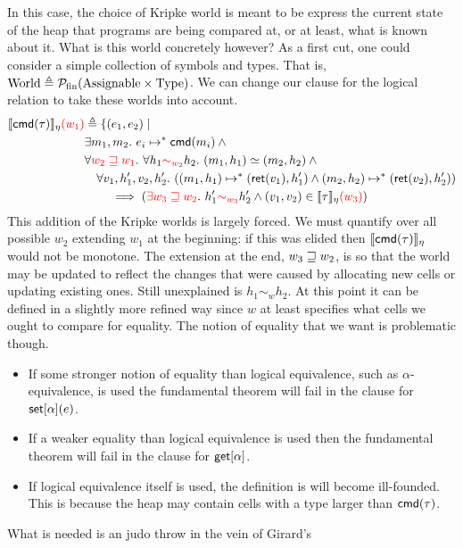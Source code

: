 In this case, the choice of Kripke world is meant to be express the
current state of the heap that programs are being compared at, or at
least, what is known about it. What is this world concretely however?
As a first cut, one could consider a simple collection of symbols and
types. That is,
$\mathrm{World} \triangleq \mathcal{P_{\mathrm{fin}}}(\mathrm{Assignable} \times \mathrm{Type})$. We can change
our clause for the logical relation to take these worlds into
account.
\begin{align*}
  \llbracket \mathsf{cmd}(\tau) \rrbracket_\eta{\color{red} (w_1)}& \triangleq \{(e_1, e_2) \mid\\
  &\exists m_1, m_2.\ e_i \mapsto^* \mathsf{cmd}(m_i) \land{}\\
  &\forall {\color{red} w_2 \ensuremath{\mathrel{\sqsupseteq}}w_1}.\ \forall h_1 {\color{red} \sim_{w_2}} h_2.
  \ (m_1, h_1) \simeq (m_2, h_2) \land{}\\
  &\quad \forall v_1, h_1', v_2, h_2'.
  \ ((m_1, h_1) \mapsto^* (\mathsf{ret}(v_1), h_1') \land (m_2, h_2) \mapsto^* (\mathsf{ret}(v_2), h_2'))\\
  &\qquad \implies ({\color{red} \exists w_3 \mathrel{\sqsupseteq} w_2}.
    \ h_1' {\color{red} \sim_{w_3}} h_2' \land (v_1, v_2) \in \llbracket \tau \rrbracket_\eta{\color{red} (w_3)})
\end{align*}
This addition of the Kripke worlds is largely forced. We must quantify
over all possible $w_2$ extending $w_1$ at the beginning: if this was
elided then $\llbracket \mathsf{cmd}(\tau) \rrbracket_\eta$ would not be monotone. The
extension at the end, $w_3 \mathrel{\sqsupseteq} w_2$, is so that the world may be
updated to reflect the changes that were caused by allocating new
cells or updating existing ones. Still unexplained is
$h_1 \sim_w h_2$. At this point it can be defined in a slightly more
refined way since $w$ at least specifies what cells we ought to
compare for equality. The notion of equality that we want is
problematic though.
\begin{itemize}
\item If some stronger notion of equality than logical equivalence,
  such as $\alpha$-equivalence, is used the fundamental theorem will
  fail in the clause for $\mathsf{set}[\alpha](e)$.
\item If a weaker equality than logical equivalence is used then the
  fundamental theorem will fail in the clause for $\mathsf{get}[\alpha]$.
\item If logical equivalence itself is used, the definition is will
  become ill-founded. This is because the heap may contain cells with
  a type larger than $\mathsf{cmd}(\tau)$.
\end{itemize}
What is needed is an judo throw in the vein of Girard's
